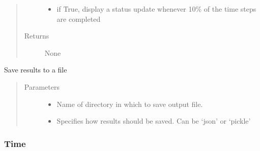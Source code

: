 \documentclass[letterpaper,10pt,english]{sphinxmanual}
\begin{document}
\begin{fulllineitems}
\begin{fulllineitems}
\begin{quote}
\begin{description}
\begin{itemize}
\item {} 
 \textendash{} if True, display a status update whenever 10\% of the time steps are completed

\end{itemize}

\item[{Returns}] \leavevmode
None

\end{description}\end{quote}

\end{fulllineitems}


\begin{fulllineitems}
\label{\detokenize{index:feast.EmissionSimModules.simulation_classes.Scenario.save}}
Save results to a file
\begin{quote}\begin{description}
\item[{Parameters}] \leavevmode\begin{itemize}
\item {} 
 \textendash{} Name of directory in which to save output file.

\item {} 
 \textendash{} Specifies how results should be saved. Can be ‘json’ or ‘pickle’

\end{itemize}

\end{description}\end{quote}

\end{fulllineitems}


\end{fulllineitems}



\subsubsection{Time}
\label{\detokenize{index:time}}
\end{document}
